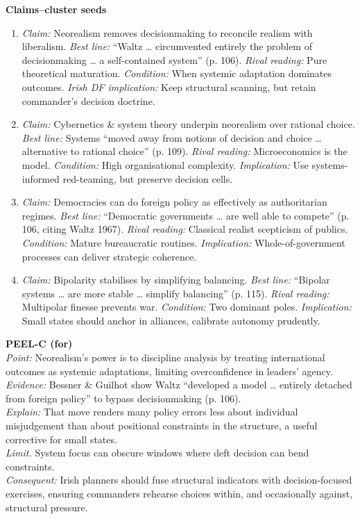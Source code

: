 \textbf{Claims–cluster seeds}
\begin{enumerate}
	\item \textit{Claim:} Neorealism removes decisionmaking to reconcile realism with liberalism. \textit{Best line:} “Waltz … circumvented entirely the problem of decisionmaking … a self-contained system” (p. 106). \textit{Rival reading:} Pure theoretical maturation. \textit{Condition:} When systemic adaptation dominates outcomes. \textit{Irish DF implication:} Keep structural scanning, but retain commander’s decision doctrine.
	\item \textit{Claim:} Cybernetics \& system theory underpin neorealism over rational choice. \textit{Best line:} Systems “moved away from notions of decision and choice … alternative to rational choice” (p. 109). \textit{Rival reading:} Microeconomics is the model. \textit{Condition:} High organisational complexity. \textit{Implication:} Use systems-informed red-teaming, but preserve decision cells.
	\item \textit{Claim:} Democracies can do foreign policy as effectively as authoritarian regimes. \textit{Best line:} “Democratic governments … are well able to compete” (p. 106, citing Waltz 1967). \textit{Rival reading:} Classical realist scepticism of publics. \textit{Condition:} Mature bureaucratic routines. \textit{Implication:} Whole-of-government processes can deliver strategic coherence.
	\item \textit{Claim:} Bipolarity stabilises by simplifying balancing. \textit{Best line:} “Bipolar systems … are more stable … simplify balancing” (p. 115). \textit{Rival reading:} Multipolar finesse prevents war. \textit{Condition:} Two dominant poles. \textit{Implication:} Small states should anchor in alliances, calibrate autonomy prudently.
\end{enumerate}

\textbf{PEEL-C (for)}\\
\textit{Point:} Neorealism’s power is to discipline analysis by treating international outcomes as systemic adaptations, limiting overconfidence in leaders’ agency.\\
\textit{Evidence:} Bessner \& Guilhot show Waltz “developed a model … entirely detached from foreign policy” to bypass decisionmaking (p. 106).\\
\textit{Explain:} That move renders many policy errors less about individual misjudgement than about positional constraints in the structure, a useful corrective for small states.\\
\textit{Limit.} System focus can obscure windows where deft decision can bend constraints.\\
\textit{Consequent:} Irish planners should fuse structural indicators with decision-focused exercises, ensuring commanders rehearse choices within, and occasionally against, structural pressure.

